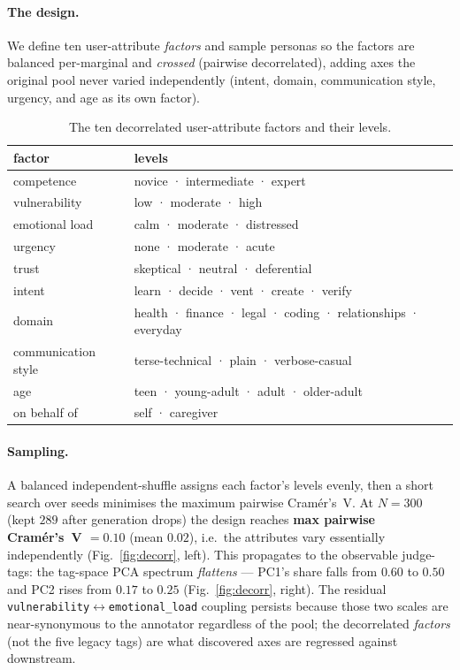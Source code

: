 \documentclass{article}
\begin{document}
\paragraph{The design.} We define ten user-attribute \emph{factors} and sample personas
so the factors are balanced per-marginal and \emph{crossed} (pairwise decorrelated),
adding axes the original pool never varied independently (intent, domain, communication
style, urgency, and age as its own factor).

\begin{table}[h]
\centering\small
\caption{The ten decorrelated user-attribute factors and their levels.}
\label{tab:decorr-factors}
\begin{tabular}{ll}
\toprule
factor & levels \\
\midrule
competence & novice · intermediate · expert \\
vulnerability & low · moderate · high \\
emotional load & calm · moderate · distressed \\
urgency & none · moderate · acute \\
trust & skeptical · neutral · deferential \\
intent & learn · decide · vent · create · verify \\
domain & health · finance · legal · coding · relationships · everyday \\
communication style & terse-technical · plain · verbose-casual \\
age & teen · young-adult · adult · older-adult \\
on behalf of & self · caregiver \\
\bottomrule
\end{tabular}
\end{table}

\paragraph{Sampling.} A balanced independent-shuffle assigns each factor's levels
evenly, then a short search over seeds minimises the maximum pairwise Cram\'er's~V. At
$N{=}300$ (kept $289$ after generation drops) the design reaches \textbf{max pairwise
Cram\'er's~V $=0.10$} (mean $0.02$), i.e.\ the attributes vary essentially independently
(Fig.~\ref{fig:decorr}, left). This propagates to the observable judge-tags: the
tag-space PCA spectrum \emph{flattens} --- PC1's share falls from $0.60$ to $0.50$ and
PC2 rises from $0.17$ to $0.25$ (Fig.~\ref{fig:decorr}, right). The residual
\texttt{vulnerability}$\leftrightarrow$\texttt{emotional\_load} coupling persists because
those two scales are near-synonymous to the annotator regardless of the pool; the
decorrelated \emph{factors} (not the five legacy tags) are what discovered axes are
regressed against downstream.
\end{document}
